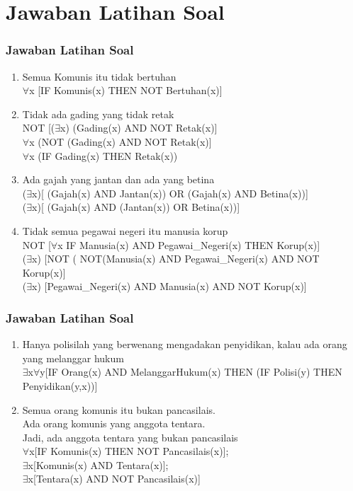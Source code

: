 \documentclass[handout]{beamer}
\theoremstyle{definition}
\theoremstyle{example}
\begin{document}
\section{Jawaban Latihan Soal}
\begin{frame}
	\frametitle{Jawaban Latihan Soal}
	\begin{enumerate}
	   \item {\color{red} Semua} Komunis itu tidak bertuhan\\
	         {\color{red} $\forall$x} [IF Komunis(x) THEN NOT Bertuhan(x)]\\
	   \item Tidak {\color{red}ada} gading yang tidak retak\\
	         NOT  [({\color{red}$\exists$x}) (Gading(x) AND NOT Retak(x)]\\
	         {\color{red}$\forall$x} (NOT (Gading(x) AND NOT Retak(x)]\\
	         {\color{red}$\forall$x} (IF Gading(x) THEN Retak(x))
	   \item {\color{red}Ada} gajah yang jantan dan {\color{red}ada} yang betina\\
	   ({\color{red}$\exists$x})[ (Gajah(x) AND Jantan(x)) OR (Gajah(x) AND Betina(x))]\\
	   ({\color{red}$\exists$x})[ (Gajah(x) AND (Jantan(x)) OR Betina(x))]
	   \item {\color{red}Tidak semua} pegawai negeri itu manusia korup\\
	    NOT [{\color{red}$\forall$x} IF Manusia(x) AND Pegawai\_Negeri(x) THEN Korup(x)]\\
	   ({\color{red}$\exists$x}) [NOT ( NOT(Manusia(x) AND Pegawai\_Negeri(x) AND NOT Korup(x)]\\
	   ({\color{red}$\exists$x}) [Pegawai\_Negeri(x) AND Manusia(x) AND NOT Korup(x)]      
	\end{enumerate}
\end{frame}

\begin{frame}
	\frametitle{Jawaban Latihan Soal}
	\begin{enumerate}
		\addtocounter{enumi}{4}
	    \item {\color{red}Hanya polisilah} yang berwenang mengadakan penyidikan, kalau {\color{red}ada} orang yang melanggar hukum\\
	     {\color{red}$\exists$x}{\color{red}$\forall$y}[IF Orang(x) AND MelanggarHukum(x) THEN (IF Polisi(y) THEN Penyidikan(y,x))]
	    \item {\color{red}Semua} orang komunis itu bukan pancasilais.\\
	          {\color{red}Ada} orang komunis yang anggota tentara.\\
	          Jadi, {\color{red}ada} anggota tentara yang bukan pancasilais\\
	          {\color{red}$\forall$x}[IF Komunis(x) THEN NOT Pancasilais(x)];\\ 
	          {\color{red}$\exists$x}[Komunis(x) AND Tentara(x)];\\
	          {\color{red}$\exists$x}[Tentara(x) AND NOT Pancasilais(x)]  
     \end{enumerate}
\end{frame}
\end{document}
